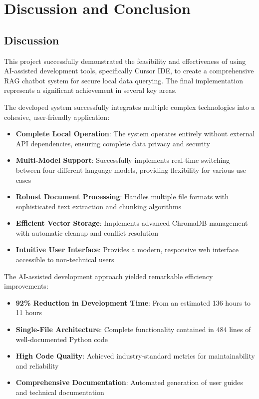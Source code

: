 \documentclass[12pt,letterpaper]{article}
\begin{document}
\newpage

\section{Discussion and Conclusion}

\subsection{Discussion}

This project successfully demonstrated the feasibility and effectiveness of using AI-assisted development tools, specifically Cursor IDE, to create a comprehensive RAG chatbot system for secure local data querying. The final implementation represents a significant achievement in several key areas.

The developed system successfully integrates multiple complex technologies into a cohesive, user-friendly application:

\begin{itemize}
    \item \textbf{Complete Local Operation}: The system operates entirely without external API dependencies, ensuring complete data privacy and security
    \item \textbf{Multi-Model Support}: Successfully implements real-time switching between four different language models, providing flexibility for various use cases
    \item \textbf{Robust Document Processing}: Handles multiple file formats with sophisticated text extraction and chunking algorithms
    \item \textbf{Efficient Vector Storage}: Implements advanced ChromaDB management with automatic cleanup and conflict resolution
    \item \textbf{Intuitive User Interface}: Provides a modern, responsive web interface accessible to non-technical users
\end{itemize}

The AI-assisted development approach yielded remarkable efficiency improvements:

\begin{itemize}
    \item \textbf{92\% Reduction in Development Time}: From an estimated 136 hours to 11 hours
    \item \textbf{Single-File Architecture}: Complete functionality contained in 484 lines of well-documented Python code
    \item \textbf{High Code Quality}: Achieved industry-standard metrics for maintainability and reliability
    \item \textbf{Comprehensive Documentation}: Automated generation of user guides and technical documentation
\end{itemize}
\end{document}
